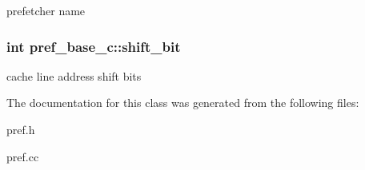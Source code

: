 \label{classpref__base__c_a65b7301bf63f68f8d6c7b893dffa3353}
prefetcher name \hypertarget{classpref__base__c_a71a0797d8af664c87de0ebcf7fb36e96}{
\subsubsection[{shift\_\-bit}]{\setlength{\rightskip}{0pt plus 5cm}int {\bf pref\_\-base\_\-c::shift\_\-bit}}}
\label{classpref__base__c_a71a0797d8af664c87de0ebcf7fb36e96}
cache line address shift bits 

The documentation for this class was generated from the following files:\begin{DoxyCompactItemize}
\item 
pref.h\item 
pref.cc\end{DoxyCompactItemize}
